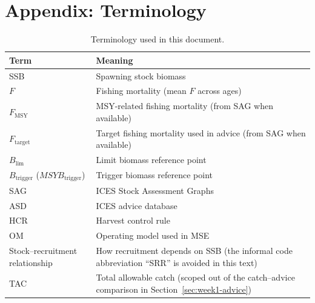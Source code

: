 \documentclass[11pt,a4paper]{extarticle}
\begin{document}
\newpage
\section{Appendix: Terminology}
\label{app:terms}

\begin{table}[H]
\centering
\caption{Terminology used in this document.}
\label{tab:week1-terms}
\begin{tabular}{@{}lp{11cm}@{}}
\toprule
Term & Meaning \\
\midrule
SSB & Spawning stock biomass \\
\(F\) & Fishing mortality (mean \(F\) across ages) \\
\(F_{\mathrm{MSY}}\) & MSY-related fishing mortality (from SAG when available) \\
\(F_{\mathrm{target}}\) & Target fishing mortality used in advice (from SAG when available) \\
\(B_{\mathrm{lim}}\) & Limit biomass reference point \\
\(B_{\mathrm{trigger}}\) (\(MSYB_{\mathrm{trigger}}\)) & Trigger biomass reference point \\
SAG & ICES Stock Assessment Graphs \\
ASD & ICES advice database \\
HCR & Harvest control rule \\
OM & Operating model used in MSE \\
Stock--recruitment relationship & How recruitment depends on SSB
  (the informal code abbreviation ``SRR'' is avoided in this text) \\
TAC & Total allowable catch (scoped out of the catch--advice comparison in
  Section~\ref{sec:week1-advice}) \\
\bottomrule
\end{tabular}
\end{table}
\end{document}
